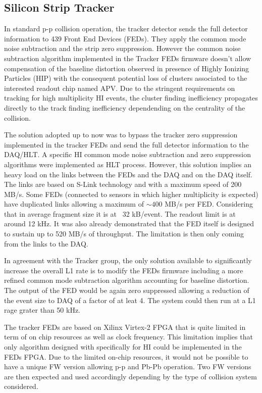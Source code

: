 \subsection{Silicon Strip Tracker\label{subsec:SiTracker}}
In standard p-p collision operation, the tracker detector sends the full detector information to 439 Front End Devices (FEDs). They apply the common mode noise subtraction and the strip zero suppression. However the common noise subtraction algorithm implemented in the Tracker FEDs firmware doesn’t allow compensation of the baseline distortion observed in presence of Highly Ionizing Particles (HIP) with the consequent potential loss of clusters associated to the interested readout chip named APV. Due to the stringent requirements on tracking for high multiplicity HI events, the cluster finding inefficiency propagates directly to the track finding inefficiency dependending on the centrality of the collision.  

The solution adopted up to now was to bypass the tracker zero suppression implemented in the tracker FEDs and send the full detector information to the DAQ/HLT. A specific HI common mode noise subtraction and zero suppression algorithms were implemented as HLT process. However, this solution implies an heavy load on the links between the FEDs and the DAQ and on the DAQ itself. The links are based on S-Link technology and with a maximum speed of 200 MB/s. Some FEDs (connected to sensors in which higher multiplicity is expected) have duplicated links allowing a maximum of $\sim 400$ MB/s per FED.  Considering that in average fragment size it is at ~32 kB/event. The readout limit is at around 12 kHz. It was also already demonstrated that the FED itself is designed to sustain up to 520 MB/s of throughput. The limitation is then only coming from the links to the DAQ. 

In agreement with the Tracker group, the only solution available to significantly increase the overall L1 rate is to modify the FEDs firmware including a more refined common mode subtraction algorithm accounting for baseline distortion. The output of the FED would be again zero suppressed allowing a reduction of the event size to DAQ of a factor of at leat 4. The system could then run at a L1 rage grater than 50 kHz. 

The tracker FEDs are based on Xilinx Virtex-2 FPGA that is quite limited in term of on chip resources as well as clock frequency. This limitation implies that only algorithm designed with specifically for HI could be implemented in the FEDs FPGA. Due to the  limited on-chip resources, it would not be possible to have a unique FW version allowing p-p and Pb-Pb operation. Two FW versions are then expected and used accordingly depending by the type of collision system considered. 

